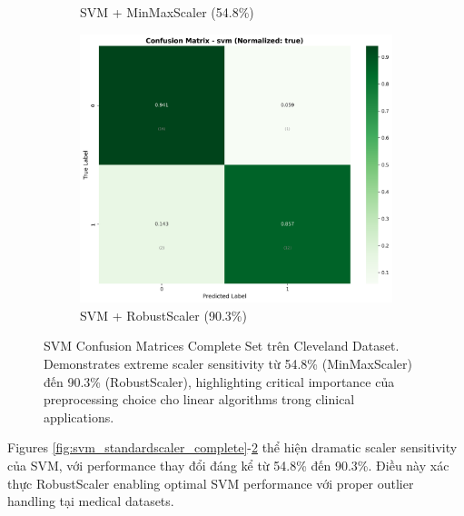 \begin{figure}[H]
\begin{subfigure}[b]{0.315\textwidth}
\caption{SVM + MinMaxScaler (54.8\%)}
\label{fig:svm_minmaxscaler_complete}
\end{subfigure}
\hfill
\begin{subfigure}[b]{0.315\textwidth}
\centering
\includegraphics[width=1\textwidth]{Result/cleveland_dataset/confusion_matrices/svm_numeric_dataset_RobustScaler.png}
\caption{SVM + RobustScaler (90.3\%)}
\label{fig:svm_robustscaler_complete}
\end{subfigure}

\caption{SVM Confusion Matrices Complete Set trên Cleveland Dataset. Demonstrates extreme scaler sensitivity từ 54.8\% (MinMaxScaler) đến 90.3\% (RobustScaler), highlighting critical importance của preprocessing choice cho linear algorithms trong clinical applications.}
\label{fig:svm_all_scalers_complete_analysis}
\end{figure}

Figures \ref{fig:svm_standardscaler_complete}-\ref{fig:svm_robustscaler_complete} thể hiện dramatic scaler sensitivity của SVM, với performance thay đổi đáng kể từ 54.8\% đến 90.3\%. Điều này xác thực RobustScaler enabling optimal SVM performance với proper outlier handling tại medical datasets.

